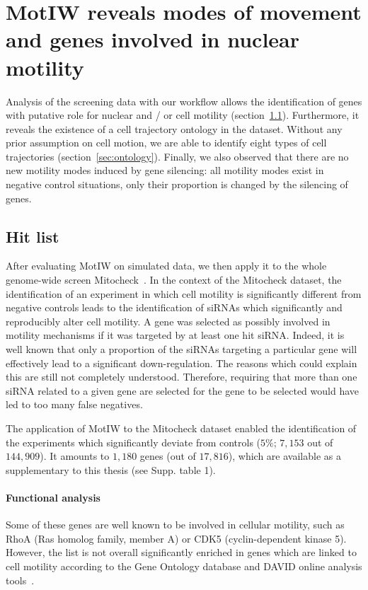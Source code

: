 \section{MotIW reveals modes of movement and genes involved in nuclear
motility}
\label{sec:mitocheck}
Analysis of the screening data with our workflow allows the
identification of genes with putative role for nuclear and / or cell
motility (section~\ref{sec:hitlist}). Furthermore, it reveals the existence of
a cell trajectory ontology in the dataset. Without any prior
assumption on cell motion, we are able to identify eight types of cell
trajectories (section~\ref{sec:ontology}). Finally, we also observed
that there are no new motility modes induced by gene silencing: all
motility modes exist in negative control situations, only their
proportion is changed by the silencing of genes. 

\subsection{Hit list}
\label{sec:hitlist}
After evaluating MotIW on simulated data, we then apply it to the
whole genome-wide screen Mitocheck~\cite{pmid20360735}. In the context
of the Mitocheck dataset, the identification of an experiment in which
cell motility is significantly different from negative controls leads
to the identification of siRNAs which significantly and reproducibly
alter cell motility. A gene was selected as possibly involved in
motility mechanisms if it was targeted by at least one hit
siRNA. Indeed, it is well known that only a proportion of the siRNAs
targeting a particular gene will effectively lead to a significant
down-regulation. 
The reasons which could explain this are still not completely
understood. Therefore, requiring that more than one siRNA related to a
given gene are selected for the gene to be selected would have led to
too many false negatives.

The application of MotIW to the Mitocheck dataset enabled the identification of the experiments which significantly deviate from controls ($5\%$; $7,153$ out of $144,909$). It amounts to $1,180$ genes (out of $17,816$), which are available as a supplementary to this thesis (see Supp. table 1).%


\paragraph{Functional analysis} Some of these genes are well known to
be involved in cellular motility, such as RhoA (Ras homolog family,
member A) or CDK5 (cyclin-dependent kinase 5). However, the list is
not overall significantly enriched in genes which are linked to cell
motility according to the Gene Ontology database and DAVID online
analysis tools~\cite{pmid22543366}.  

